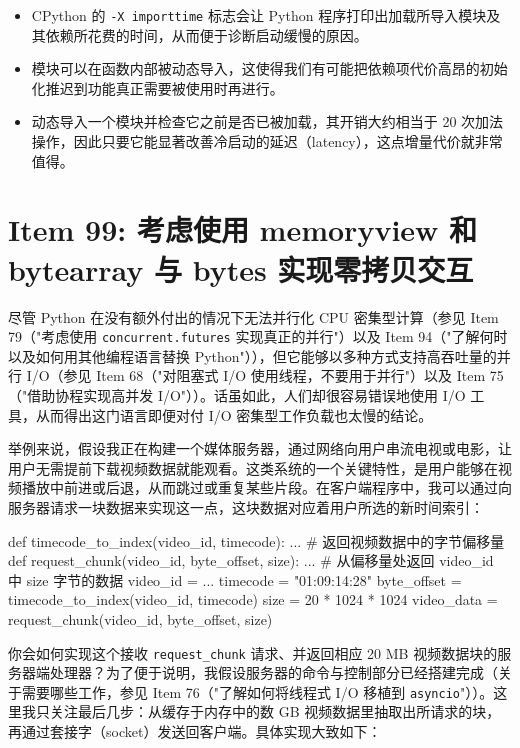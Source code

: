 \begin{itemize}
\item CPython 的 \texttt{-X importtime} 标志会让 Python 程序打印出加载所导入模块及其依赖所花费的时间，从而便于诊断启动缓慢的原因。
\item 模块可以在函数内部被动态导入，这使得我们有可能把依赖项代价高昂的初始化推迟到功能真正需要被使用时再进行。
\item 动态导入一个模块并检查它之前是否已被加载，其开销大约相当于 20 次加法操作，因此只要它能显著改善冷启动的延迟（latency），这点增量代价就非常值得。
\end{itemize}

\section{Item 99: 考虑使用 memoryview 和 bytearray 与 bytes 实现零拷贝交互}

尽管 Python 在没有额外付出的情况下无法并行化 CPU 密集型计算（参见 Item 79（"考虑使用 \texttt{concurrent.futures} 实现真正的并行"）以及 Item 94（"了解何时以及如何用其他编程语言替换 Python"）），但它能够以多种方式支持高吞吐量的并行 I/O（参见 Item 68（"对阻塞式 I/O 使用线程，不要用于并行"）以及 Item 75（"借助协程实现高并发 I/O"））。话虽如此，人们却很容易错误地使用 I/O 工具，从而得出这门语言即便对付 I/O 密集型工作负载也太慢的结论。

举例来说，假设我正在构建一个媒体服务器，通过网络向用户串流电视或电影，让用户无需提前下载视频数据就能观看。这类系统的一个关键特性，是用户能够在视频播放中前进或后退，从而跳过或重复某些片段。在客户端程序中，我可以通过向服务器请求一块数据来实现这一点，这块数据对应着用户所选的新时间索引：

\begin{codebox}[python]
def timecode_to_index(video_id, timecode):
    ...
    # 返回视频数据中的字节偏移量
def request_chunk(video_id, byte_offset, size):
    ...
    # 从偏移量处返回 video_id 中 size 字节的数据
video_id = ...
timecode = "01:09:14:28"
byte_offset = timecode_to_index(video_id, timecode)
size = 20 * 1024 * 1024
video_data = request_chunk(video_id, byte_offset, size)
\end{codebox}

你会如何实现这个接收 \texttt{request\_chunk} 请求、并返回相应 20 MB 视频数据块的服务器端处理器？为了便于说明，我假设服务器的命令与控制部分已经搭建完成（关于需要哪些工作，参见 Item 76（"了解如何将线程式 I/O 移植到 \texttt{asyncio}"））。这里我只关注最后几步：从缓存于内存中的数 GB 视频数据里抽取出所请求的块，再通过套接字（socket）发送回客户端。具体实现大致如下：

